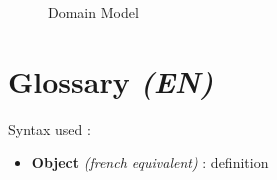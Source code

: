 \documentclass[paper=a4, fontsize=11pt]{report}
\numberwithin{equation}{section}		%
\numberwithin{figure}{section}		%
\numberwithin{table}{section}		%
\renewcommand{\bf}[1]{\textbf{#1}}
\renewcommand{\it}[1]{\textit{#1}}
\begin{document}
\begin{figure}[H]
\centering
\noindent{}
\caption{Domain Model}
\end{figure}

\section{Glossary \it{(EN)}}
\label{sec:glossary}

Syntax used :
\begin{itemize}
	\item[\textbullet] \bf{Object} \it{(french equivalent)} : definition \\
\end{itemize}
\end{document}
